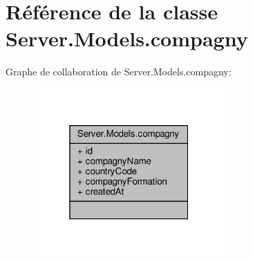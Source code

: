 \hypertarget{class_server_1_1_models_1_1compagny}{}\section{Référence de la classe Server.\+Models.\+compagny}
\label{class_server_1_1_models_1_1compagny}


Graphe de collaboration de Server.\+Models.\+compagny\+:
\nopagebreak
\begin{figure}[H]
\begin{center}
\leavevmode
\includegraphics[width=208pt]{class_server_1_1_models_1_1compagny__coll__graph}
\end{center}
\end{figure}

